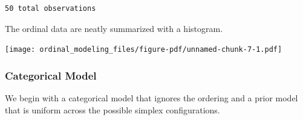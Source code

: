 \documentclass[
  letterpaper,
  DIV=11,
  numbers=noendperiod]{scrartcl}
\newenvironment{Shaded}{\begin{snugshade}}{\end{snugshade}}
\newcommand{\AttributeTok}[1]{\textcolor[rgb]{0.40,0.45,0.13}{#1}}
\newcommand{\DecValTok}[1]{\textcolor[rgb]{0.68,0.00,0.00}{#1}}
\newcommand{\FloatTok}[1]{\textcolor[rgb]{0.68,0.00,0.00}{#1}}
\newcommand{\FunctionTok}[1]{\textcolor[rgb]{0.28,0.35,0.67}{#1}}
\newcommand{\NormalTok}[1]{\textcolor[rgb]{0.00,0.23,0.31}{#1}}
\newcommand{\SpecialCharTok}[1]{\textcolor[rgb]{0.37,0.37,0.37}{#1}}
\newcommand{\StringTok}[1]{\textcolor[rgb]{0.13,0.47,0.30}{#1}}
\begin{document}
\begin{verbatim}
50 total observations
\end{verbatim}

The ordinal data are neatly summarized with a histogram.

\begin{Shaded}
\end{Shaded}

\texttt{[image: ordinal\_modeling\_files/figure-pdf/unnamed-chunk-7-1.pdf]}

\subsubsection{Categorical Model}\label{categorical-model}

We begin with a categorical model that ignores the ordering and a prior
model that is uniform across the possible simplex configurations.
\end{document}
